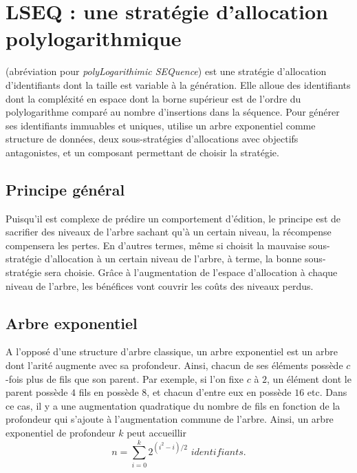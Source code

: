 
\section{LSEQ : une stratégie d'allocation polylogarithmique}

\LSEQ (abréviation pour \emph{polyLogarithimic SEQuence}) est une stratégie
d'allocation d'identifiants dont la taille est variable à la génération. Elle
alloue des identifiants dont la compléxité en espace dont la borne supérieur est
de l'ordre du polylogarithme comparé au nombre d'insertions dans la séquence.
Pour générer ses identifiants immuables et uniques, \LSEQ utilise un arbre
exponentiel comme structure de données, deux sous-stratégies d'allocations avec
objectifs antagonistes, et un composant permettant de choisir la stratégie.

\subsection{Principe général}

Puisqu'il est complexe de prédire un comportement d'édition, le principe est de
sacrifier des niveaux de l'arbre sachant qu'à un certain niveau, la récompense
compensera les pertes. En d'autres termes, même si \LSEQ choisit la mauvaise
sous-stratégie d'allocation à un certain niveau de l'arbre, à terme, la bonne
sous-stratégie sera choisie. Grâce à l'augmentation de l'espace d'allocation à
chaque niveau de l'arbre, les bénéfices vont couvrir les coûts des niveaux
perdus.


\subsection{Arbre exponentiel}

A l'opposé d'une structure d'arbre classique, un arbre exponentiel est un arbre
dont l'arité augmente avec sa profondeur. Ainsi, chacun de ses éléments possède
$c$-fois plus de fils que son parent. Par exemple, si l'on fixe $c$ à $2$, un
élément dont le parent possède $4$ fils en possède $8$, et chacun d'entre eux en
possède $16$ etc. Dans ce cas, il y a une augmentation quadratique du nombre de
fils en fonction de la profondeur qui s'ajoute à l'augmentation commune de
l'arbre. Ainsi, un arbre exponentiel de profondeur $k$ peut accueillir 
\begin{equation}
  n = \sum\limits_{i=0}^{k} 2^{(i^2-i)/2}\,\, identifiants.
\end{equation}



